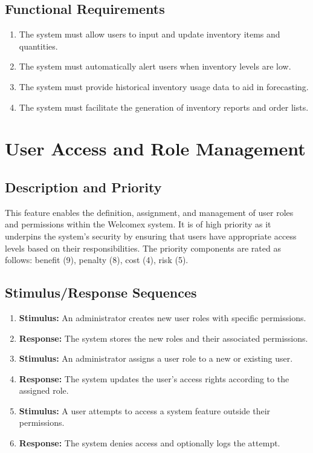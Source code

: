 \documentclass{scrreprt}
\begin{document}
\subsection{Functional Requirements}
\begin{enumerate}[resume*=func-req, leftmargin=60pt]
    \item The system must allow users to input and update inventory items and quantities.
    \item The system must automatically alert users when inventory levels are low.
    \item The system must provide historical inventory usage data to aid in forecasting.
    \item The system must facilitate the generation of inventory reports and order lists.
\end{enumerate}

\section{User Access and Role Management}
\subsection{Description and Priority}
This feature enables the definition, assignment, and management of user roles and permissions within the Welcomex system. It is of high priority as it underpins the system’s security by ensuring that users have appropriate access levels based on their responsibilities. The priority components are rated as follows: benefit (9), penalty (8), cost (4), risk (5).
\subsection{Stimulus/Response Sequences}
\begin{enumerate}
    \item \textbf{Stimulus:} An administrator creates new user roles with specific permissions.
    \item \textbf{Response:} The system stores the new roles and their associated permissions.
    \item \textbf{Stimulus:} An administrator assigns a user role to a new or existing user.
    \item \textbf{Response:} The system updates the user’s access rights according to the assigned role.
    \item \textbf{Stimulus:} A user attempts to access a system feature outside their permissions.
    \item \textbf{Response:} The system denies access and optionally logs the attempt.
\end{enumerate}
\end{document}
